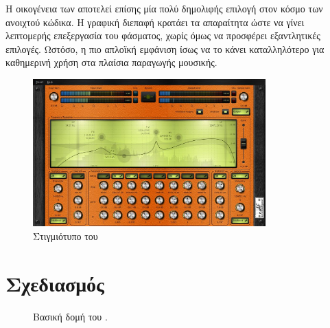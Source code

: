 \documentclass[12pt]{extarticle}
\begin{document}
\subsubsection{}

Η οικογένεια των  \cite{Calf}  αποτελεί επίσης μία πολύ 
δημολιφής επιλογή στον κόσμο των  ανοιχτού κώδικα. 
Η γραφική διεπαφή κρατάει τα απαραίτητα ώστε να γίνει 
λεπτομερής επεξεργασία του φάσματος, χωρίς όμως να προσφέρει εξαντλητικές 
επιλογές. Ωστόσο, η πιο απλοϊκή εμφάνιση ίσως να το κάνει 
καταλληλότερο για καθημερινή χρήση στα πλαίσια παραγωγής μουσικής.

\begin{figure}[!htb]
    \centering
    \includegraphics[width=0.8\textwidth]{./assets/calf.png}
    \caption{Στιγμιότυπο του }
    \label{fig:}
\end{figure}



\section{Σχεδιασμός}

\begin{figure}[!htb]

    \begin{center}
    \end{center}

    \caption{Βασική δομή του .} 
\end{figure}
\end{document}
